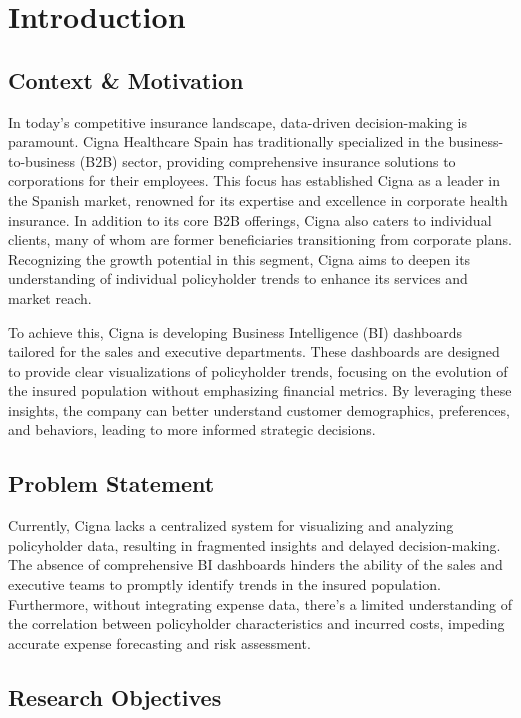 \chapter{Introduction}

\section{Context \& Motivation}

In today’s competitive insurance landscape, data-driven decision-making is paramount. Cigna Healthcare Spain has traditionally specialized in the business-to-business (B2B) sector, providing comprehensive insurance solutions to corporations for their employees. This focus has established Cigna as a leader in the Spanish market, renowned for its expertise and excellence in corporate health insurance. In addition to its core B2B offerings, Cigna also caters to individual clients, many of whom are former beneficiaries transitioning from corporate plans. Recognizing the growth potential in this segment, Cigna aims to deepen its understanding of individual policyholder trends to enhance its services and market reach.

To achieve this, Cigna is developing Business Intelligence (BI) dashboards tailored for the sales and executive departments. These dashboards are designed to provide clear visualizations of policyholder trends, focusing on the evolution of the insured population without emphasizing financial metrics. By leveraging these insights, the company can better understand customer demographics, preferences, and behaviors, leading to more informed strategic decisions.

\section{Problem Statement}

Currently, Cigna lacks a centralized system for visualizing and analyzing policyholder data, resulting in fragmented insights and delayed decision-making. The absence of comprehensive BI dashboards hinders the ability of the sales and executive teams to promptly identify trends in the insured population. Furthermore, without integrating expense data, there's a limited understanding of the correlation between policyholder characteristics and incurred costs, impeding accurate expense forecasting and risk assessment.

\section{Research Objectives}

